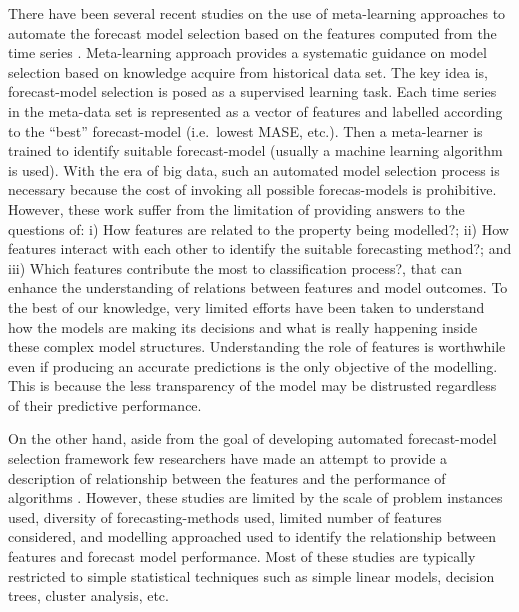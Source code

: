 \documentclass[11pt,a4paper,]{article}
\begin{document}
There have been several recent studies on the use of meta-learning
approaches to automate the forecast model selection based on the
features computed from the time series
\autocites{shah1997model}{prudencio2004meta}{lemke2010meta}{kuck2016meta}.
Meta-learning approach provides a systematic guidance on model selection
based on knowledge acquire from historical data set. The key idea is,
forecast-model selection is posed as a supervised learning task. Each
time series in the meta-data set is represented as a vector of features
and labelled according to the ``best'' forecast-model (i.e.~lowest MASE,
etc.). Then a meta-learner is trained to identify suitable
forecast-model (usually a machine learning algorithm is used). With the
era of big data, such an automated model selection process is necessary
because the cost of invoking all possible forecas-models is prohibitive.
However, these work suffer from the limitation of providing answers to
the questions of: i) How features are related to the property being
modelled?; ii) How features interact with each other to identify the
suitable forecasting method?; and iii) Which features contribute the
most to classification process?, that can enhance the understanding of
relations between features and model outcomes. To the best of our
knowledge, very limited efforts have been taken to understand how the
models are making its decisions and what is really happening inside
these complex model structures. Understanding the role of features is
worthwhile even if producing an accurate predictions is the only
objective of the modelling. This is because the less transparency of the
model may be distrusted regardless of their predictive performance.

On the other hand, aside from the goal of developing automated
forecast-model selection framework few researchers have made an attempt
to provide a description of relationship between the features and the
performance of algorithms
\autocites{schnaars1984situational}{wang2009rule}{lemke2010meta}{petropoulos2014horses}.
However, these studies are limited by the scale of problem instances
used, diversity of forecasting-methods used, limited number of features
considered, and modelling approached used to identify the relationship
between features and forecast model performance. Most of these studies
are typically restricted to simple statistical techniques such as simple
linear models, decision trees, cluster analysis, etc.
\end{document}
